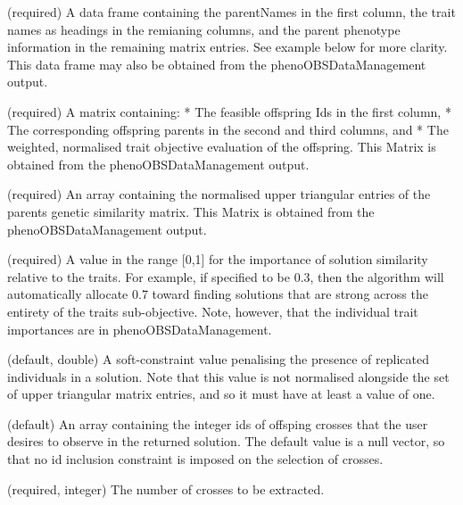 \documentclass[a4paper]{book}
\begin{document}
%
\begin{Arguments}
\begin{ldescription}
\item[\code{parentsPhenotypeDataFrame}] (required) A data frame containing the parentNames in the first column, the trait names as headings in the remianing columns, and the parent phenotype information in the remaining matrix entries.
See example below for more clarity.
This data frame may also be obtained from the phenoOBSDataManagement output.

\item[\code{offspringPhenotype}] (required) A matrix containing:
* The feasible offspring Ids in the first column,
* The corresponding offspring parents in the second and third columns, and
* The weighted, normalised trait objective evaluation of the offspring.
This Matrix is obtained from the phenoOBSDataManagement output.

\item[\code{parentsGeneticSimilarityArray}] (required) An array containing the normalised upper triangular entries of the parents genetic similarity matrix.
This Matrix is obtained from the phenoOBSDataManagement output.

\item[\code{geneticSimilarityWeight}] (required) A value in the range [0,1] for the importance of solution similarity relative to the traits.
For example, if specified to be 0.3, then the algorithm will automatically allocate 0.7 toward finding solutions that are strong across the entirety of the traits sub-objective.
Note, however, that the individual trait importances are in phenoOBSDataManagement.

\item[\code{penaltyReplicatedIndividuals}] (default, double) A soft-constraint value penalising the presence of replicated individuals in a solution.
Note that this value is not normalised alongside the set of upper triangular matrix entries, and so it must have at least a value of one.

\item[\code{inclusionSet}] (default) An array containing the integer ids of offsping crosses that the user desires to observe in the returned solution.
The default value is a null vector, so that no id inclusion constraint is imposed on the selection of crosses.

\item[\code{solutionSize}] (required, integer) The number of crosses to be extracted.


\end{ldescription}
\end{Arguments}
\end{document}

